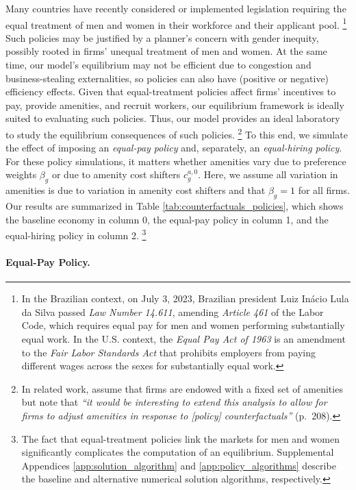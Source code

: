 Many countries have recently considered or implemented legislation requiring the equal treatment of men and women in their workforce and their applicant pool.%
%
\footnote{In the Brazilian context, on July 3, 2023, Brazilian president Luiz In{\'{a}}cio Lula da Silva passed \emph{Law Number 14.611}, amending \emph{Article 461} of the Labor Code, which requires equal pay for men and women performing substantially equal work. In the U.S. context, the \emph{Equal Pay Act of 1963} is an amendment to the \emph{Fair Labor Standards Act} that prohibits employers from paying different wages across the sexes for substantially equal work.} %
%
Such policies may be justified by a planner's concern with gender inequity, possibly rooted in firms' unequal treatment of men and women. At the same time, our model's equilibrium may not be efficient due to congestion and business-stealing externalities, so policies can also have (positive or negative) efficiency effects. Given that equal-treatment policies affect firms' incentives to pay, provide amenities, and recruit workers, our equilibrium framework is ideally suited to evaluating such policies. Thus, our model provides an ideal laboratory to study the equilibrium consequences of such policies.%
%
\footnote{In related work, \citet{LamadonMogstadSetzler2022} assume that firms are endowed with a fixed set of amenities but note that \emph{``it would be interesting to extend this analysis to allow for firms to adjust amenities in response to [policy] counterfactuals''} (p.\ 208).} %
%
To this end, we simulate the effect of imposing an {\emph{equal-pay policy}} and, separately, an {\emph{equal-hiring policy}}. For these policy simulations, it matters whether amenities vary due to preference weights $\beta_{g}$ or due to amenity cost shifters $c_{g}^{a,0}$. Here, we assume all variation in amenities is due to variation in amenity cost shifters and that $\beta_{g} = 1$ for all firms. Our results are summarized in Table \ref{tab:counterfactuals_policies}, which shows the baseline economy in column 0, the equal-pay policy in column 1, and the equal-hiring policy in column 2.%
%
\footnote{The fact that equal-treatment policies link the markets for men and women significantly complicates the computation of an equilibrium. Supplemental Appendices \ref{app:solution_algorithm} and \ref{app:policy_algorithms} describe the baseline and alternative numerical solution algorithms, respectively.} %
%


\paragraph{Equal-Pay Policy.} %

